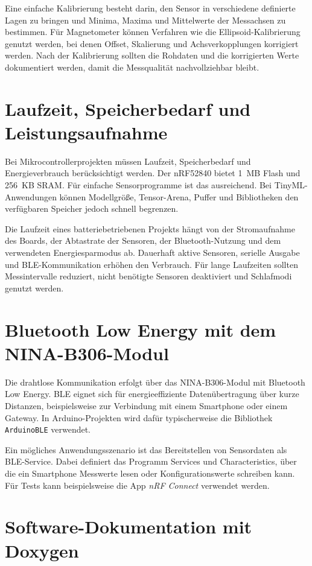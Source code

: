 Eine einfache Kalibrierung besteht darin, den Sensor in verschiedene definierte Lagen zu bringen und Minima, Maxima und Mittelwerte der Messachsen zu bestimmen. Für Magnetometer können Verfahren wie die Ellipsoid-Kalibrierung genutzt werden, bei denen Offset, Skalierung und Achsverkopplungen korrigiert werden. Nach der Kalibrierung sollten die Rohdaten und die korrigierten Werte dokumentiert werden, damit die Messqualität nachvollziehbar bleibt.

\section{Laufzeit, Speicherbedarf und Leistungsaufnahme}

Bei Mikrocontrollerprojekten müssen Laufzeit, Speicherbedarf und Energieverbrauch berücksichtigt werden. Der nRF52840 bietet 1~MB Flash und 256~KB SRAM. Für einfache Sensorprogramme ist das ausreichend. Bei TinyML-Anwendungen können Modellgröße, Tensor-Arena, Puffer und Bibliotheken den verfügbaren Speicher jedoch schnell begrenzen.

Die Laufzeit eines batteriebetriebenen Projekts hängt von der Stromaufnahme des Boards, der Abtastrate der Sensoren, der Bluetooth-Nutzung und dem verwendeten Energiesparmodus ab. Dauerhaft aktive Sensoren, serielle Ausgabe und BLE-Kommunikation erhöhen den Verbrauch. Für lange Laufzeiten sollten Messintervalle reduziert, nicht benötigte Sensoren deaktiviert und Schlafmodi genutzt werden.

\section{Bluetooth Low Energy mit dem NINA-B306-Modul}

Die drahtlose Kommunikation erfolgt über das NINA-B306-Modul mit Bluetooth Low Energy. BLE eignet sich für energieeffiziente Datenübertragung über kurze Distanzen, beispielsweise zur Verbindung mit einem Smartphone oder einem Gateway. In Arduino-Projekten wird dafür typischerweise die Bibliothek \texttt{ArduinoBLE} verwendet.

Ein mögliches Anwendungsszenario ist das Bereitstellen von Sensordaten als BLE-Service. Dabei definiert das Programm Services und Characteristics, über die ein Smartphone Messwerte lesen oder Konfigurationswerte schreiben kann. Für Tests kann beispielsweise die App \textit{nRF Connect} verwendet werden.

\section{Software-Dokumentation mit Doxygen}

